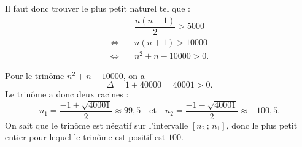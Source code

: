 	Il faut donc trouver le plus petit naturel tel que :
	\begin{align*}
		&\dfrac{n(n + 1)}{2} > 5000 \\
		\iff \quad & n(n + 1) > 10000 \\
		\iff \quad & n^2 + n - 10000 > 0.
	\end{align*}
	
	Pour le trinôme \(n^2 + n - 10000\), on a 
	\[
	\Delta = 1 + 40000 = 40001 > 0.
	\]
	Le trinôme a donc deux racines :
	\[
	n_1 = \dfrac{-1 + \sqrt{40001}}{2} \approx 99,5 \quad \text{et} \quad n_2 = \dfrac{-1 - \sqrt{40001}}{2} \approx -100,5.
	\]
	On sait que le trinôme est négatif sur l'intervalle \([n_2\,;\,n_1]\), donc le plus petit entier pour lequel le trinôme est positif est \(100\).
